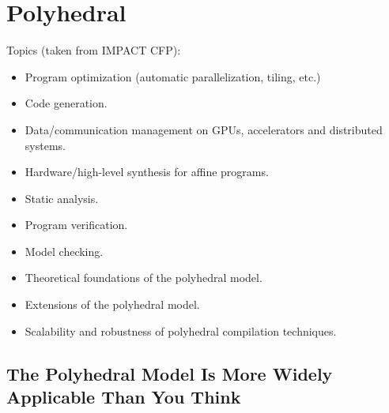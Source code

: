 \section{Polyhedral}\label{sec:polly}
Topics (taken from IMPACT CFP):
\begin{itemize}
    \item Program optimization (automatic parallelization, tiling, etc.)
    \item Code generation.
    \item Data/communication management on GPUs, accelerators and distributed systems.
    \item Hardware/high-level synthesis for affine programs.
    \item Static analysis.
    \item Program verification.
    \item Model checking.
    \item Theoretical foundations of the polyhedral model.
    \item Extensions of the polyhedral model.
    \item Scalability and robustness of polyhedral compilation techniques.
\end{itemize}

\subsection{The Polyhedral Model Is More Widely Applicable Than You Think}
\cite{Benabderrahmane2010ThePM}

